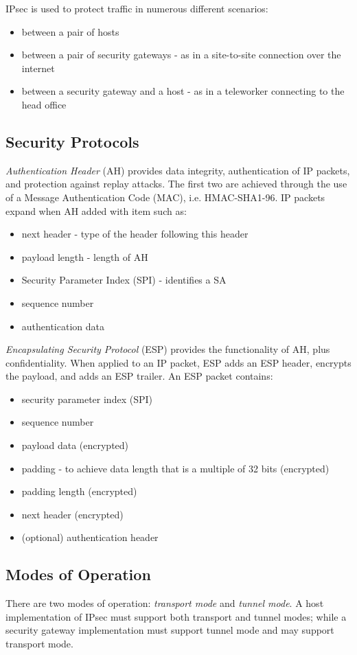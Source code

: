 IPsec is used to protect traffic in numerous different scenarios:
\begin{itemize}
    \item between a pair of hosts
    \item between a pair of security gateways - as in a site-to-site connection over the internet
    \item between a security gateway and a host - as in a teleworker connecting to the head office
\end{itemize}


\subsection{Security Protocols}
\textit{Authentication Header} (AH) provides data integrity, authentication of IP packets, and protection against replay attacks. The first two are achieved through the use of a Message Authentication Code (MAC), i.e. HMAC-SHA1-96. IP packets expand when AH added with item such as:
\begin{itemize}
    \item next header - type of the header following this header
    \item payload length - length of AH
    \item Security Parameter Index (SPI) - identifies a SA
    \item sequence number
    \item authentication data
\end{itemize}

\textit{Encapsulating Security Protocol} (ESP) provides the functionality of AH, plus confidentiality. When applied to an IP packet, ESP adds an ESP header, encrypts the payload, and adds an ESP trailer. An ESP packet contains:
\begin{itemize}
    \item security parameter index (SPI)
    \item sequence number
    \item payload data (encrypted)
    \item padding - to achieve data length that is a multiple of 32 bits (encrypted)
    \item padding length (encrypted)
    \item next header (encrypted)
    \item (optional) authentication header
\end{itemize}

\subsection{Modes of Operation}
There are two modes of operation: \textit{transport mode} and \textit{tunnel mode}. A host implementation of IPsec must support both transport and tunnel modes; while a security gateway implementation must support tunnel mode and may support transport mode.

